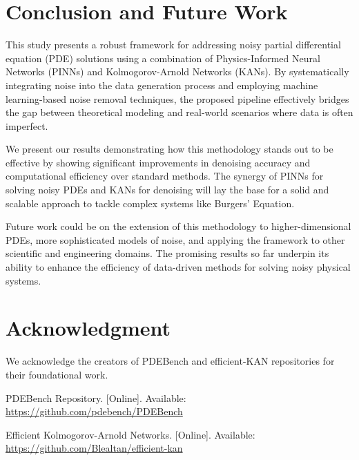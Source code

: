 \documentclass[conference]{IEEEtran}
\begin{document}
\section{Conclusion and Future Work}
This study presents a robust framework for addressing noisy partial differential equation (PDE) solutions using a combination of Physics-Informed Neural Networks (PINNs) and Kolmogorov-Arnold Networks (KANs). By systematically integrating noise into the data generation process and employing machine learning-based noise removal techniques, the proposed pipeline effectively bridges the gap between theoretical modeling and real-world scenarios where data is often imperfect.

We present our results demonstrating how this methodology stands out to be effective by showing significant improvements in denoising accuracy and computational efficiency over standard methods. The synergy of PINNs for solving noisy PDEs and KANs for denoising will lay the base for a solid and scalable approach to tackle complex systems like Burgers' Equation.

Future work could be on the extension of this methodology to higher-dimensional PDEs, more sophisticated models of noise, and applying the framework to other scientific and engineering domains. The promising results so far underpin its ability to enhance the efficiency of data-driven methods for solving noisy physical systems.

\section*{Acknowledgment}
We acknowledge the creators of PDEBench and efficient-KAN repositories for their foundational work.

\begin{thebibliography}{1}
PDEBench Repository. [Online]. Available: \url{https://github.com/pdebench/PDEBench}

Efficient Kolmogorov-Arnold Networks. [Online]. Available: \url{https://github.com/Blealtan/efficient-kan}

\end{thebibliography}
\end{document}
